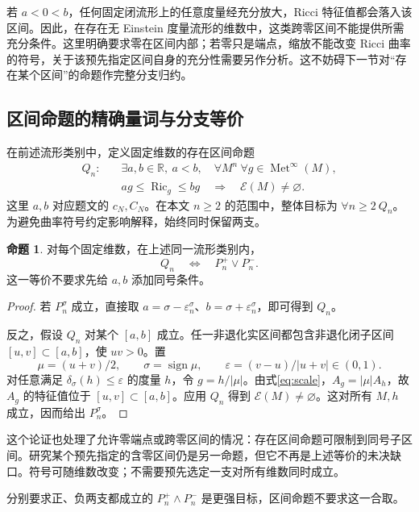 \documentclass[11pt,a4paper]{article}
\theoremstyle{definition}
\newtheorem{proposition}[definition]{命题}
\newcommand{\Ric}{\operatorname{Ric}}
\newcommand{\Met}{\operatorname{Met}}
\newcommand{\Ein}{\mathcal E}
\begin{document}
若 $a<0<b$，任何固定闭流形上的任意度量经充分放大，Ricci 特征值都会落入该区间。因此，在存在无 Einstein 度量流形的维数中，这类跨零区间不能提供所需充分条件。这里明确要求零在区间内部；若零只是端点，缩放不能改变 Ricci 曲率的符号，关于该预先指定区间自身的充分性需要另作分析。这不妨碍下一节对“存在某个区间”的命题作完整分支归约。

\subsection{区间命题的精确量词与分支等价}

在前述流形类别中，定义固定维数的存在区间命题
\begin{equation}\label{eq:Q}
\begin{split}
Q_n:\quad &\exists a,b\in\mathbb R,\ a<b,\quad
\forall M^n\ \forall g\in\Met^\infty(M),\\
&ag\le\Ric_g\le bg\quad\Longrightarrow\quad\Ein(M)\ne\varnothing.
\end{split}
\end{equation}
这里 $a,b$ 对应题文的 $c_N,C_N$。在本文 $n\ge2$ 的范围中，整体目标为 $\forall n\ge2\ Q_n$。为避免曲率符号约定影响解释，始终同时保留两支。

\begin{proposition}\label{prop:branches}
对每个固定维数，在上述同一流形类别内，
\[
Q_n\quad\Longleftrightarrow\quad P_n^+\vee P_n^-.
\]
这一等价不要求先给 $a,b$ 添加同号条件。
\end{proposition}
\begin{proof}
若 $P_n^\sigma$ 成立，直接取 $a=\sigma-\varepsilon_n^\sigma$、$b=\sigma+\varepsilon_n^\sigma$，即可得到 $Q_n$。

反之，假设 $Q_n$ 对某个 $[a,b]$ 成立。任一非退化实区间都包含非退化闭子区间 $[u,v]\subset[a,b]$，使 $uv>0$。置
\[
\mu=(u+v)/2,\qquad \sigma=\operatorname{sign}\mu,\qquad
\varepsilon=(v-u)/|u+v|\in(0,1).
\]
对任意满足 $\delta_\sigma(h)\le\varepsilon$ 的度量 $h$，令 $g=h/|\mu|$。由式\eqref{eq:scale}，$A_g=|\mu|A_h$，故 $A_g$ 的特征值位于 $[u,v]\subset[a,b]$。应用 $Q_n$ 得到 $\Ein(M)\ne\varnothing$。这对所有 $M,h$ 成立，因而给出 $P_n^\sigma$。
\end{proof}

这个论证也处理了允许零端点或跨零区间的情况：存在区间命题可限制到同号子区间。研究某个预先指定的含零区间仍是另一命题，但它不再是上述等价的未决缺口。符号可随维数改变；不需要预先选定一支对所有维数同时成立。

分别要求正、负两支都成立的 $P_n^+\wedge P_n^-$ 是更强目标，区间命题不要求这一合取。
\end{document}
